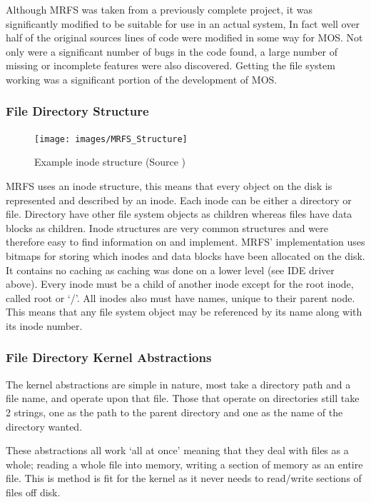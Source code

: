 \documentclass[a4paper]{report}
\begin{document}
Although MRFS was taken from a previously complete project, it was significantly modified to be suitable for use in an actual system, In fact well over half of the original sources lines of code were modified in some way for MOS. Not only were a significant number of bugs in the code found, a large number of missing or incomplete features were also discovered. Getting the file system working was a significant portion of the development of MOS.

\subsubsection{File Directory Structure}

\begin{figure}[ht]
\centering
\texttt{[image: images/MRFS\_Structure]}
\caption{Example inode structure (Source \cite{Inode})}
\label{fig:WinTitleBarScreen}
\end{figure}


MRFS uses an inode structure, this means that every object on the disk is represented and described by an inode. Each inode can be either a directory or file. Directory have other file system objects as children whereas files have data blocks as children. Inode structures are very common structures and were therefore easy to find information on and implement. MRFS' implementation uses bitmaps for storing which inodes and data blocks have been allocated on the disk. It contains no caching as caching was done on a lower level (see IDE driver above). Every inode must be a child of another inode except for the root inode, called root or `/'. All inodes also must have names, unique to their parent node. This means that any file system object may be referenced by its name along with its inode number.

\subsubsection{File Directory Kernel Abstractions}

The kernel abstractions are simple in nature, most take a directory path and a file name, and operate upon that file. Those that operate on directories still take 2 strings, one as the path to the parent directory and one as the name of the directory wanted.

These abstractions all work `all at once' meaning that they deal with files as a whole; reading a whole file into memory, writing a section of memory as an entire file. This is method is fit for the kernel as it never needs to read/write sections of files off disk.
\end{document}
